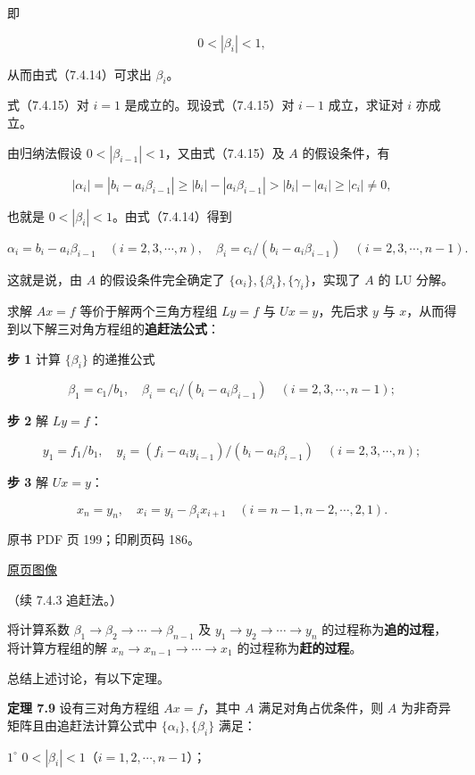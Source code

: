 即

\[
0<|\beta_i|<1,
\]

从而由式（7.4.14）可求出 \(\beta_i\)。

式（7.4.15）对 \(i=1\) 是成立的。现设式（7.4.15）对 \(i-1\) 成立，求证对 \(i\) 亦成立。

由归纳法假设 \(0<|\beta_{i-1}|<1\)，又由式（7.4.15）及 \(A\) 的假设条件，有

\[
|\alpha_i|=|b_i-a_i\beta_{i-1}|\geqslant|b_i|-|a_i\beta_{i-1}|>|b_i|-|a_i|\geqslant|c_i|\neq0,
\]

也就是 \(0<|\beta_i|<1\)。由式（7.4.14）得到

\[
\alpha_i=b_i-a_i\beta_{i-1}\quad(i=2,3,\cdots,n),\quad
\beta_i=c_i/(b_i-a_i\beta_{i-1})\quad(i=2,3,\cdots,n-1).
\]

这就是说，由 \(A\) 的假设条件完全确定了 \(\{\alpha_i\},\{\beta_i\},\{\gamma_i\}\)，实现了 \(A\) 的 LU 分解。

求解 \(Ax=f\) 等价于解两个三角方程组 \(Ly=f\) 与 \(Ux=y\)，先后求 \(y\) 与 \(x\)，从而得到以下解三对角方程组的\textbf{追赶法公式}：

\textbf{步 1} 计算 \(\{\beta_i\}\) 的递推公式

\[
\beta_1=c_1/b_1,\quad\beta_i=c_i/(b_i-a_i\beta_{i-1})\quad(i=2,3,\cdots,n-1);
\]

\textbf{步 2} 解 \(Ly=f\)：

\[
y_1=f_1/b_1,\quad y_i=(f_i-a_iy_{i-1})/(b_i-a_i\beta_{i-1})\quad(i=2,3,\cdots,n);
\]

\textbf{步 3} 解 \(Ux=y\)：

\[
x_n=y_n,\quad x_i=y_i-\beta_ix_{i+1}\quad(i=n-1,n-2,\cdots,2,1).
\]

\clearpage

原书 PDF 页 199；印刷页码 186。

\href{source-images/pdf-199.jpeg}{原页图像}

（续 7.4.3 追赶法。）

将计算系数 \(\beta_1\to\beta_2\to\cdots\to\beta_{n-1}\) 及 \(y_1\to y_2\to\cdots\to y_n\) 的过程称为\textbf{追的过程}，将计算方程组的解 \(x_n\to x_{n-1}\to\cdots\to x_1\) 的过程称为\textbf{赶的过程}。

总结上述讨论，有以下定理。

\textbf{定理 7.9} 设有三对角方程组 \(Ax=f\)，其中 \(A\) 满足对角占优条件，则 \(A\) 为非奇异矩阵且由追赶法计算公式中 \(\{\alpha_i\},\{\beta_i\}\) 满足：

\(1^\circ\) \(0<|\beta_i|<1\)（\(i=1,2,\cdots,n-1\)）；

